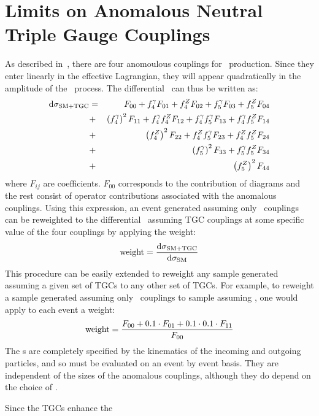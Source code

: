 \graphicspath{{Chapters/TGCLimits/Figures/}}
\chapter{Limits on Anomalous Neutral Triple Gauge Couplings}
\label{chap:TGCLimits}

As described in~\sec{}, there are four anomoulous couplings for \ZZ\ production.
Since they enter linearly in the effective Lagrangian, they will appear
quadratically in the amplitude of the \ZZllll\ process. The differential \cx\
can thus be written as:
\begin{eqnarray}\label{eqn:dsigma}
{\rm d}\sigma_{\rm SM+TGC} & = & F_{00} + f_4^\gamma F_{01} + f_4^Z F_{02} + f_5^\gamma F_{03} + f_5^Z F_{04}  \nonumber \\
&+& \left(f_4^\gamma\right)^2F_{11} + f_4^\gamma f_4^Z F_{12} +  f_4^\gamma f_5^\gamma F_{13} + f_4^\gamma f_5^Z F_{14}  \nonumber \\
&+& \left(f_4^Z\right)^2F_{22} + f_4^Zf_5^\gamma F_{23} + f_4^Zf_5^Z F_{24}  \nonumber \\
&+& \left(f_5^\gamma\right)^2F_{33} + f_5^\gamma f_5^Z F_{34} \nonumber \\
&+& \left(f_5^Z\right)^2F_{44}
\end{eqnarray}
where $F_{ij}$ are coefficients. $F_{00}$ corresponds to the contribution of \sm
diagrams and the rest consist of operator contributions associated with the
anomalous couplings. Using this expression, an event generated assuming only
\sm\ couplings can be reweighted to the differential \cx\ assuming TGC couplings
at some specific value of the four couplings by applying the weight:
\begin{equation}
{\rm weight} = \frac{{\rm d}\sigma_{\rm SM+TGC}}{{\rm d}\sigma_{\rm SM}}
\end{equation}
 This procedure can be easily extended to reweight any sample generated assuming
a given set of TGCs to any other set of TGCs. For example, to reweight a sample
generated assuming only \sm\ couplings to sample assuming \ffourg=0.1, one would
apply to each event a weight:
\begin{eqnarray}\label{revisit}
{\rm weight} = \frac{F_{00} + 0.1 \cdot  F_{01} + 0.1\cdot 0.1 \cdot
F_{11}}{F_{00}}
\end{eqnarray}
The \Fij s are completely
specified by the kinematics of the incoming and outgoing particles, and so must
be evaluated on an event by event basis. They are
independent of the sizes of the anomalous couplings, although they do depend on
the choice of \formactor.

Since the TGCs enhance the \cx\

